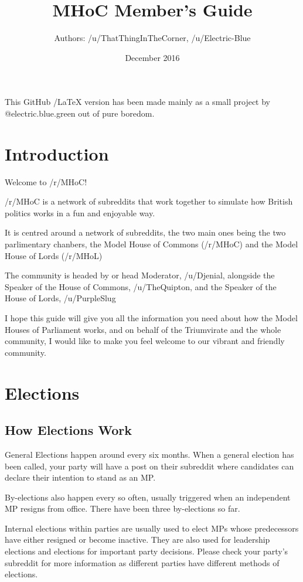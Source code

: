 \documentclass{article}
\title{MHoC Member's Guide}
\author{Authors: /u/ThatThingInTheCorner, /u/Electric-Blue}
\date{December 2016}
\begin{document}
\maketitle

This GitHub /LaTeX version has been made mainly as a small project by @electric.blue.green out of pure boredom.

\section{Introduction}
Welcome to /r/MHoC!

/r/MHoC is a network of subreddits that work together to simulate how British politics works in a fun and enjoyable way.

It is centred around a network of subreddits, the two main ones being the two parlimentary chanbers, the Model House of Commons (/r/MHoC) and the Model House of Lords (/r/MHoL)

The community is headed by or head Moderator, /u/Djenial, alongside the Speaker of the House of Commons, /u/TheQuipton, and the Speaker of the House of Lords, /u/PurpleSlug

I hope this guide will give you all the information you need about how the Model Houses of Parliament works, and on behalf of the Triumvirate and the whole community, I would like to make you feel welcome to our vibrant and friendly community.

\section{Elections}
\subsection{How Elections Work}
General Elections happen around every six months. When a general election has been called, your party will have a post on their subreddit where candidates can declare their intention to stand as an MP.

By-elections also happen every so often, usually triggered when an independent MP resigns from office. There have been three by-elections so far.

Internal elections within parties are usually used to elect MPs whose predecessors have either resigned or become inactive. They are also used for leadership elections and elections for important party decisions. Please check your party's subreddit for more information as different parties have different methods of elections.
\end{document}
